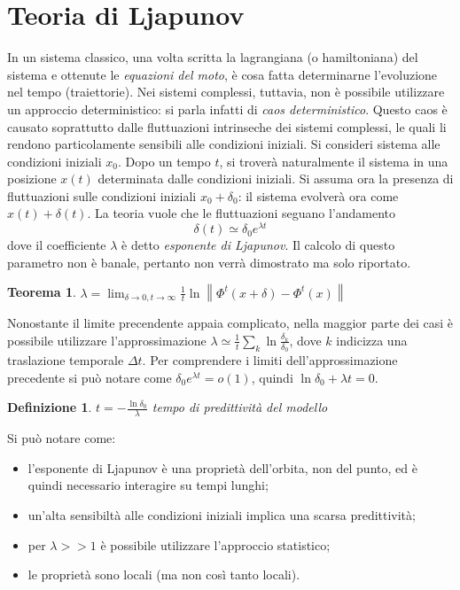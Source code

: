 \documentclass[12pt, a4paper]{book}
\theoremstyle{theorem}
\newtheorem{definition}{Definizione}[section]
\newtheorem{theorem}{Teorema}[section]
\begin{document}
		\section{Teoria di Ljapunov}
			In un sistema classico, una volta scritta la lagrangiana (o hamiltoniana) del sistema e ottenute le \emph{equazioni del moto}, è cosa fatta determinarne l'evoluzione nel tempo (traiettorie).
			Nei sistemi complessi, tuttavia, non è possibile utilizzare un approccio deterministico: si parla infatti di \emph{caos deterministico}.
			Questo caos è causato soprattutto dalle fluttuazioni intrinseche dei sistemi complessi, le quali li rendono particolamente sensibili alle condizioni iniziali.
			Si consideri sistema alle condizioni iniziali $x_{0}$.
			Dopo un tempo $t$, si troverà naturalmente il sistema in una posizione $x(t)$ determinata dalle condizioni iniziali.
			Si assuma ora la presenza di fluttuazioni sulle condizioni iniziali $x_{0}+\delta_{0}$: il sistema evolverà ora come $x(t)+\delta(t)$.
			La teoria vuole che le fluttuazioni seguano l'andamento
			\begin{equation*}
				\delta(t)\simeq\delta_{0}e^{\lambda t}
			\end{equation*}
			dove il coefficiente $\lambda$ è detto \emph{esponente di Ljapunov}.
			Il calcolo di questo parametro non è banale, pertanto non verrà dimostrato ma solo riportato.
			\begin{theorem}
				$\lambda=\lim_{\delta\to0,t\to\infty}\frac{1}{t}\ln\left\lVert \Phi^{t}(x+\delta)-\Phi^{t}(x) \right\rVert$
			\end{theorem}
			Nonostante il limite precendente appaia complicato, nella maggior parte dei casi è possibile utilizzare l'approssimazione $\lambda\simeq\frac{1}{t}\sum_{k}\ln\frac{\delta_{k}}{\delta_{0}}$, dove $k$ indicizza una traslazione temporale $\Delta t$. 
			Per comprendere i limiti dell'approssimazione precedente si può notare come $\delta_{0}e^{\lambda t}=o(1)$, quindi $\ln\delta_{0}+\lambda t=0$.
			\begin{definition}
				$t=-\frac{\ln\delta_{0}}{\lambda}$ tempo di predittività del modello	
			\end{definition}
			Si può notare come:
			\begin{itemize}
				\item l'esponente di Ljapunov è una proprietà dell'orbita, non del punto, ed è quindi necessario interagire su tempi lunghi;
				\item un'alta sensibiltà alle condizioni iniziali implica una scarsa predittività;
				\item per $\lambda>>1$ è possibile utilizzare l'approccio statistico;
				\item le proprietà sono locali (ma non così tanto locali).
			\end{itemize}
\end{document}
